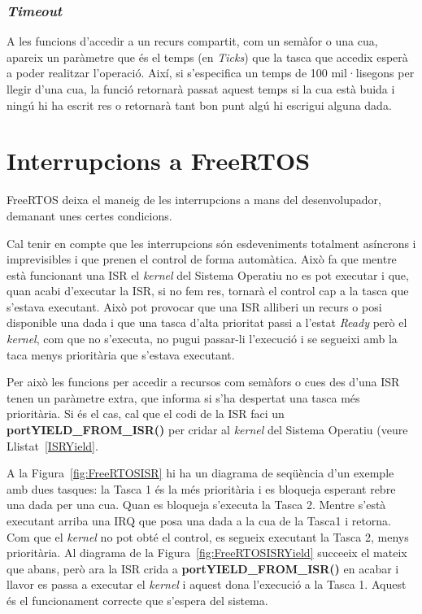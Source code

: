 \subsubsection{\em Timeout}
A les funcions d'accedir a un recurs compartit, com un semàfor o una cua, apareix un paràmetre que és el temps (en {\em Ticks}) que la tasca que accedix esperà a poder realitzar l'operació. Així, si s'especifica un temps de 100 mil·lisegons per llegir d'una cua, la funció retornarà passat aquest temps si la cua està buida i ningú hi ha escrit res o retornarà tant bon punt algú hi escrigui alguna dada.

\section{Interrupcions a FreeRTOS}
\label{ch:FreeRTOSIRQ}

FreeRTOS deixa el maneig de les interrupcions a mans del desenvolupador, demanant unes certes condicions.

Cal tenir en compte que les interrupcions són esdeveniments totalment asíncrons i imprevisibles i que prenen el control de forma automàtica. Això fa que mentre està funcionant una \gls{ISR} el {\em kernel} del Sistema Operatiu no es pot executar i que, quan acabi d'executar la ISR, si no fem res, tornarà el control cap a la tasca que s'estava executant. Això pot provocar que una ISR alliberi un recurs o posi disponible una dada i que una tasca d'alta prioritat passi a l'estat {\em Ready} però el {\em kernel}, com que no s'executa, no pugui passar-li l'execució i se segueixi amb la taca menys prioritària que s'estava executant.

Per això les funcions per accedir a recursos com semàfors o cues des d'una \gls{ISR} tenen un paràmetre extra, que informa si s'ha despertat una tasca més prioritària. Si és el cas, cal que el codi de la ISR faci un {\bf portYIELD\_FROM\_ISR()} per cridar al {\em kernel} del Sistema Operatiu (veure Llistat~\ref{ISRYield}.

A la Figura~\ref{fig:FreeRTOSISR} hi ha un diagrama de seqüència d'un exemple amb dues tasques: la Tasca 1 és la més prioritària i es bloqueja esperant rebre una dada per una cua. Quan es bloqueja s'executa la Tasca 2. Mentre s'està executant arriba una IRQ que posa una dada a la cua de la Tasca1 i retorna. Com que el {\em kernel} no pot obté el control, es segueix executant la Tasca 2, menys prioritària. Al diagrama de la Figura~\ref{fig:FreeRTOSISRYield} succeeix el mateix que abans, però ara la \gls{ISR} crida a {\bf portYIELD\_FROM\_ISR()} en acabar i llavor es passa a executar el {\em kernel} i aquest dona l'execució a la Tasca 1. Aquest és el funcionament correcte que s'espera del sistema.

